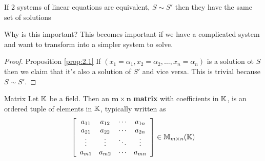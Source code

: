 
\begin{proposition} \label{prop:2.1}
    If 2 systems of linear equations are equivalent, \(S \sim S'\) then they have the same set of solutions
\end{proposition}
\begin{remark}
    Why is this important? This becomes important if we have a complicated system and want to transform into a simpler system to solve.
\end{remark}

\begin{proof} {Proposition \ref{prop:2.1}}
    If \((x_1 = \alpha_1, x_2 = \alpha_2, \dots, x_n = \alpha_n)\) is a solution ot \(S\) then we claim that it's also a solution of \(S'\) and vice versa. This is trivial because \(S \sim S'\).
\end{proof}

\begin{definition} {Matrix}
    Let \(\mathbb{K}\) be a field. Then an \(\mathbf{m \times n}\) \textbf{matrix} with coefficients in \(\mathbb{K}\), is an ordered tuple of elements in \(\mathbb{K}\), typically written as \[
        \left[
            \begin{array}{cccc}
                a_{11} & a_{12} & \cdots & a_{1n} \\
                a_{21} & a_{22} & \cdots & a_{2n} \\
                \vdots & \vdots & \ddots & \vdots \\
                a_{m1} & a_{m2} & \cdots & a_{mn} \\
            \end{array}
            \right] \in \mathbb{M}_{m\times n}(\mathbb{K})
    \]
\end{definition}

